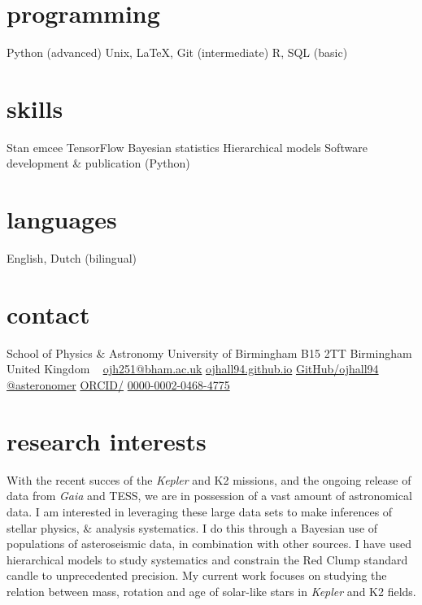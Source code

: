 \documentclass[]{k-cv} %
\begin{document}


\begin{aside} %
\section{programming}
Python (advanced)
Unix, LaTeX, Git (intermediate)
R, SQL (basic)
\section{skills}
Stan
emcee
TensorFlow
Bayesian statistics
Hierarchical models
Software development \& publication (Python)
\section{languages}
English, Dutch (bilingual)
\section{contact}
School of Physics \& Astronomy
University of Birmingham
B15 2TT
Birmingham
United Kingdom
~
\href{mailto:ojh251@student.bham.ac.uk}{ojh251@bham.ac.uk}
\href{http://www.ojhall94.github.io}{ojhall94.github.io}
\href{http://www.github.com/ojhall94}{GitHub/ojhall94}
\href{http://www.twitter.com/asteronomer}{@asteronomer}
\href{http://www.orcid.com/0000-0002-0468-4775}{ORCID/}
\href{http://www.orcid.com/0000-0002-0468-4775}{0000-0002-0468-4775}
\end{aside}

\section{research interests}
\bodyfont With the recent succes of the \textit{Kepler} and K2 missions, and the ongoing release of data from \textit{Gaia} and TESS, we are in possession of a vast amount of astronomical data. I am interested in leveraging these large data sets to make inferences of stellar physics, \& analysis systematics. I do this through a Bayesian use of populations of asteroseismic data, in combination with other sources. I have used hierarchical models to study systematics and constrain the Red Clump standard candle to unprecedented precision. My current work focuses on studying the relation between mass, rotation and age of solar-like stars in \textit{Kepler} and K2 fields.
\end{document}
